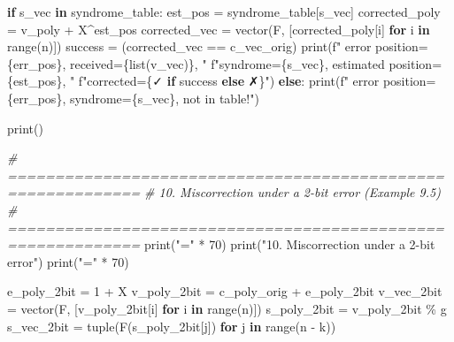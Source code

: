 \documentclass[
]{article}
\newenvironment{Shaded}{}{}
\newcommand{\BuiltInTok}[1]{\textcolor[rgb]{0.00,0.50,0.00}{#1}}
\newcommand{\CommentTok}[1]{\textcolor[rgb]{0.38,0.63,0.69}{\textit{#1}}}
\newcommand{\ControlFlowTok}[1]{\textcolor[rgb]{0.00,0.44,0.13}{\textbf{#1}}}
\newcommand{\DecValTok}[1]{\textcolor[rgb]{0.25,0.63,0.44}{#1}}
\newcommand{\KeywordTok}[1]{\textcolor[rgb]{0.00,0.44,0.13}{\textbf{#1}}}
\newcommand{\NormalTok}[1]{#1}
\newcommand{\OperatorTok}[1]{\textcolor[rgb]{0.40,0.40,0.40}{#1}}
\newcommand{\SpecialCharTok}[1]{\textcolor[rgb]{0.25,0.44,0.63}{#1}}
\newcommand{\SpecialStringTok}[1]{\textcolor[rgb]{0.73,0.40,0.53}{#1}}
\newcommand{\StringTok}[1]{\textcolor[rgb]{0.25,0.44,0.63}{#1}}
\begin{document}
\begin{Shaded}
\begin{Highlighting}[]
    \ControlFlowTok{if}\NormalTok{ s\_vec }\KeywordTok{in}\NormalTok{ syndrome\_table:}
\NormalTok{        est\_pos }\OperatorTok{=}\NormalTok{ syndrome\_table[s\_vec]}
\NormalTok{        corrected\_poly }\OperatorTok{=}\NormalTok{ v\_poly }\OperatorTok{+}\NormalTok{ X}\OperatorTok{\^{}}\NormalTok{est\_pos}
\NormalTok{        corrected\_vec }\OperatorTok{=}\NormalTok{ vector(F, [corrected\_poly[i] }\ControlFlowTok{for}\NormalTok{ i }\KeywordTok{in} \BuiltInTok{range}\NormalTok{(n)])}
\NormalTok{        success }\OperatorTok{=}\NormalTok{ (corrected\_vec }\OperatorTok{==}\NormalTok{ c\_vec\_orig)}
        \BuiltInTok{print}\NormalTok{(}\SpecialStringTok{f"  error position=}\SpecialCharTok{\{}\NormalTok{err\_pos}\SpecialCharTok{\}}\SpecialStringTok{, received=}\SpecialCharTok{\{}\BuiltInTok{list}\NormalTok{(v\_vec)}\SpecialCharTok{\}}\SpecialStringTok{, "}
              \SpecialStringTok{f"syndrome=}\SpecialCharTok{\{}\NormalTok{s\_vec}\SpecialCharTok{\}}\SpecialStringTok{, estimated position=}\SpecialCharTok{\{}\NormalTok{est\_pos}\SpecialCharTok{\}}\SpecialStringTok{, "}
              \SpecialStringTok{f"corrected=}\SpecialCharTok{\{}\StringTok{\textquotesingle{}✓\textquotesingle{}} \ControlFlowTok{if}\NormalTok{ success }\ControlFlowTok{else} \StringTok{\textquotesingle{}✗\textquotesingle{}}\SpecialCharTok{\}}\SpecialStringTok{"}\NormalTok{)}
    \ControlFlowTok{else}\NormalTok{:}
        \BuiltInTok{print}\NormalTok{(}\SpecialStringTok{f"  error position=}\SpecialCharTok{\{}\NormalTok{err\_pos}\SpecialCharTok{\}}\SpecialStringTok{, syndrome=}\SpecialCharTok{\{}\NormalTok{s\_vec}\SpecialCharTok{\}}\SpecialStringTok{, not in table!"}\NormalTok{)}

\BuiltInTok{print}\NormalTok{()}

\CommentTok{\# ============================================================}
\CommentTok{\# 10. Miscorrection under a 2{-}bit error (Example 9.5)}
\CommentTok{\# ============================================================}
\BuiltInTok{print}\NormalTok{(}\StringTok{"="} \OperatorTok{*} \DecValTok{70}\NormalTok{)}
\BuiltInTok{print}\NormalTok{(}\StringTok{"10. Miscorrection under a 2{-}bit error"}\NormalTok{)}
\BuiltInTok{print}\NormalTok{(}\StringTok{"="} \OperatorTok{*} \DecValTok{70}\NormalTok{)}

\NormalTok{e\_poly\_2bit }\OperatorTok{=} \DecValTok{1} \OperatorTok{+}\NormalTok{ X}
\NormalTok{v\_poly\_2bit }\OperatorTok{=}\NormalTok{ c\_poly\_orig }\OperatorTok{+}\NormalTok{ e\_poly\_2bit}
\NormalTok{v\_vec\_2bit }\OperatorTok{=}\NormalTok{ vector(F, [v\_poly\_2bit[i] }\ControlFlowTok{for}\NormalTok{ i }\KeywordTok{in} \BuiltInTok{range}\NormalTok{(n)])}
\NormalTok{s\_poly\_2bit }\OperatorTok{=}\NormalTok{ v\_poly\_2bit }\OperatorTok{\%}\NormalTok{ g}
\NormalTok{s\_vec\_2bit }\OperatorTok{=} \BuiltInTok{tuple}\NormalTok{(F(s\_poly\_2bit[j]) }\ControlFlowTok{for}\NormalTok{ j }\KeywordTok{in} \BuiltInTok{range}\NormalTok{(n }\OperatorTok{{-}}\NormalTok{ k))}


\end{Highlighting}
\end{Shaded}
\end{document}

